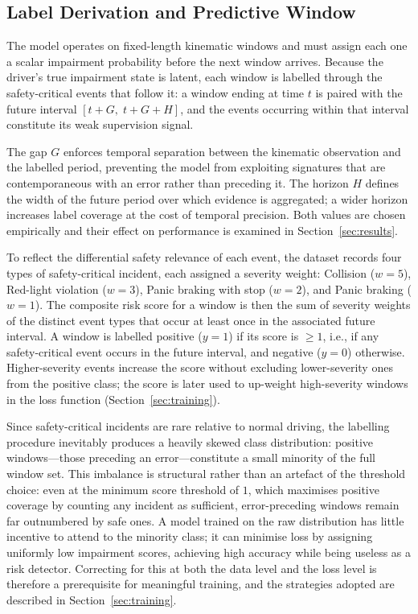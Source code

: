 \subsection{Label Derivation and Predictive Window}

The model operates on fixed-length kinematic windows and must assign each one
a scalar impairment probability before the next window arrives.
Because the driver's true impairment state is latent, each window is labelled
through the safety-critical events that follow it: a window ending at time $t$
is paired with the future interval
$[t + G,\; t + G + H]$,
and the events occurring within that interval constitute its weak supervision signal.

The gap $G$ enforces temporal separation between the kinematic observation
and the labelled period, preventing the model from exploiting signatures that
are contemporaneous with an error rather than preceding it.
The horizon $H$ defines the width of the future period over which evidence is
aggregated; a wider horizon increases label coverage at the cost of temporal
precision.
Both values are chosen empirically and their effect on performance is examined
in Section~\ref{sec:results}.

To reflect the differential safety relevance of each event, the dataset records
four types of safety-critical incident, each assigned a severity weight:
Collision ($w = 5$), Red-light violation ($w = 3$),
Panic braking with stop ($w = 2$), and Panic braking ($w = 1$).
The composite risk score for a window is then the sum of severity weights of
the distinct event types that occur at least once in the associated future interval.
A window is labelled positive ($y = 1$) if its score is $\geq 1$, i.e., if any
safety-critical event occurs in the future interval, and negative ($y = 0$) otherwise.
Higher-severity events increase the score without excluding lower-severity ones
from the positive class; the score is later used to up-weight high-severity
windows in the loss function (Section~\ref{sec:training}).

Since safety-critical incidents are rare relative to normal driving, the
labelling procedure inevitably produces a heavily skewed class distribution:
positive windows---those preceding an error---constitute a small minority of
the full window set.
This imbalance is structural rather than an artefact of the threshold choice:
even at the minimum score threshold of $1$, which maximises positive coverage by
counting any incident as sufficient, error-preceding windows remain far
outnumbered by safe ones.
A model trained on the raw distribution has little incentive to attend to the
minority class; it can minimise loss by assigning uniformly low impairment
scores, achieving high accuracy while being useless as a risk detector.
Correcting for this at both the data level and the loss level is therefore a
prerequisite for meaningful training, and the strategies adopted are described
in Section~\ref{sec:training}.

